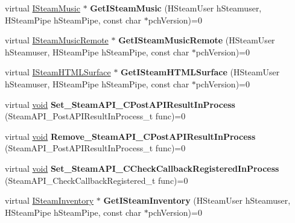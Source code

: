 \begin{DoxyCompactItemize}
\item 
\hypertarget{classISteamClient_ab5580f6c84a63c879ca5685180775632}{}virtual \hyperlink{classISteamMusic}{I\+Steam\+Music} $\ast$ {\bfseries Get\+I\+Steam\+Music} (H\+Steam\+User h\+Steamuser, H\+Steam\+Pipe h\+Steam\+Pipe, const char $\ast$pch\+Version)=0\label{classISteamClient_ab5580f6c84a63c879ca5685180775632}

\item 
\hypertarget{classISteamClient_aff68d261527fd710c0787736f1e5e75b}{}virtual \hyperlink{classISteamMusicRemote}{I\+Steam\+Music\+Remote} $\ast$ {\bfseries Get\+I\+Steam\+Music\+Remote} (H\+Steam\+User h\+Steamuser, H\+Steam\+Pipe h\+Steam\+Pipe, const char $\ast$pch\+Version)=0\label{classISteamClient_aff68d261527fd710c0787736f1e5e75b}

\item 
\hypertarget{classISteamClient_a6a1eb108665dc05f2ce7916944ddf2a1}{}virtual \hyperlink{classISteamHTMLSurface}{I\+Steam\+H\+T\+M\+L\+Surface} $\ast$ {\bfseries Get\+I\+Steam\+H\+T\+M\+L\+Surface} (H\+Steam\+User h\+Steamuser, H\+Steam\+Pipe h\+Steam\+Pipe, const char $\ast$pch\+Version)=0\label{classISteamClient_a6a1eb108665dc05f2ce7916944ddf2a1}

\item 
\hypertarget{classISteamClient_a3b756103e24ca04a96d877c0e7e36bf9}{}virtual \hyperlink{SDL__audio_8h_a52835ae37c4bb905b903cbaf5d04b05f}{void} {\bfseries Set\+\_\+\+Steam\+A\+P\+I\+\_\+\+C\+Post\+A\+P\+I\+Result\+In\+Process} (Steam\+A\+P\+I\+\_\+\+Post\+A\+P\+I\+Result\+In\+Process\+\_\+t func)=0\label{classISteamClient_a3b756103e24ca04a96d877c0e7e36bf9}

\item 
\hypertarget{classISteamClient_ac794eda1c21a3e43ff049f3343b119ad}{}virtual \hyperlink{SDL__audio_8h_a52835ae37c4bb905b903cbaf5d04b05f}{void} {\bfseries Remove\+\_\+\+Steam\+A\+P\+I\+\_\+\+C\+Post\+A\+P\+I\+Result\+In\+Process} (Steam\+A\+P\+I\+\_\+\+Post\+A\+P\+I\+Result\+In\+Process\+\_\+t func)=0\label{classISteamClient_ac794eda1c21a3e43ff049f3343b119ad}

\item 
\hypertarget{classISteamClient_ad1601470ace7e54208d4e1c77dbb4cb2}{}virtual \hyperlink{SDL__audio_8h_a52835ae37c4bb905b903cbaf5d04b05f}{void} {\bfseries Set\+\_\+\+Steam\+A\+P\+I\+\_\+\+C\+Check\+Callback\+Registered\+In\+Process} (Steam\+A\+P\+I\+\_\+\+Check\+Callback\+Registered\+\_\+t func)=0\label{classISteamClient_ad1601470ace7e54208d4e1c77dbb4cb2}

\item 
\hypertarget{classISteamClient_a19f151e23cab90e10a7a87f88488dd3b}{}virtual \hyperlink{classISteamInventory}{I\+Steam\+Inventory} $\ast$ {\bfseries Get\+I\+Steam\+Inventory} (H\+Steam\+User h\+Steamuser, H\+Steam\+Pipe h\+Steam\+Pipe, const char $\ast$pch\+Version)=0\label{classISteamClient_a19f151e23cab90e10a7a87f88488dd3b}


\end{DoxyCompactItemize}
